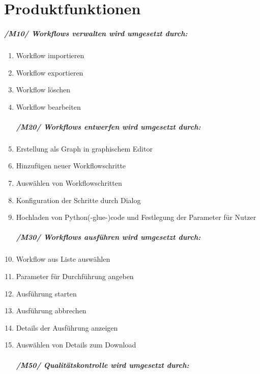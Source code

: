 \chapter{Produktfunktionen}

\paragraph{/M10/ \textit{Workflows verwalten} wird umgesetzt durch:}

\renewcommand{\labelenumi}{/FA\arabic{enumi}0/}
\begin{enumerate}
    \setlength\itemsep{-1em}
    \item Workflow importieren
    \item Workflow exportieren
    \item Workflow löschen
    \item Workflow bearbeiten

\paragraph{/M20/ \textit{Workflows entwerfen} wird umgesetzt durch:}

    \setlength\itemsep{-1em}
    \item Erstellung als Graph in graphischem Editor
    \item Hinzufügen neuer Workflowschritte
    \item Auswählen von Workflowschritten
    \item Konfiguration der Schritte durch Dialog
    \item Hochladen von Python(-glue-)code und Festlegung der Parameter für Nutzer %
    
\paragraph{/M30/ \textit{Workflows ausführen} wird umgesetzt durch:}

    \setlength\itemsep{-1em}
    \item Workflow aus Liste auswählen
    \item Parameter für Durchführung angeben
    \item Ausführung starten
    \item Ausführung abbrechen
    \item Details der Ausführung anzeigen
    \item Auswählen von Details zum Download
    
\paragraph{/M50/ \textit{Qualitätskontrolle} wird umgesetzt durch:}


\end{enumerate}
